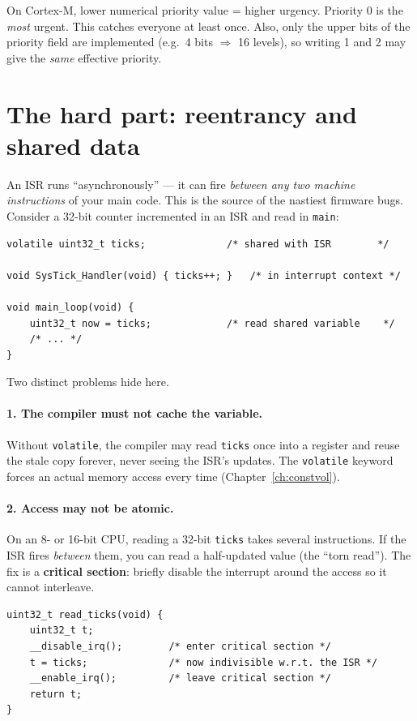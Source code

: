 \documentclass[11pt,a4paper,oneside]{book}
\newcommand{\code}[1]{\texttt{#1}}
\begin{document}
\begin{warning}
On Cortex-M, lower numerical priority value = higher urgency. Priority 0 is the
\emph{most} urgent. This catches everyone at least once. Also, only the upper
bits of the priority field are implemented (e.g.\ 4 bits $\Rightarrow$ 16
levels), so writing 1 and 2 may give the \emph{same} effective priority.
\end{warning}

\section{The hard part: reentrancy and shared data}

An ISR runs ``asynchronously'' --- it can fire \emph{between any two machine
instructions} of your main code. This is the source of the nastiest firmware
bugs. Consider a 32-bit counter incremented in an ISR and read in \code{main}:

\begin{lstlisting}
volatile uint32_t ticks;              /* shared with ISR        */

void SysTick_Handler(void) { ticks++; }   /* in interrupt context */

void main_loop(void) {
    uint32_t now = ticks;             /* read shared variable    */
    /* ... */
}
\end{lstlisting}

Two distinct problems hide here.

\paragraph{1. The compiler must not cache the variable.}
Without \code{volatile}, the compiler may read \code{ticks} once into a
register and reuse the stale copy forever, never seeing the ISR's updates. The
\code{volatile} keyword forces an actual memory access every time
(Chapter~\ref{ch:constvol}).

\paragraph{2. Access may not be atomic.}
On an 8- or 16-bit CPU, reading a 32-bit \code{ticks} takes several
instructions. If the ISR fires \emph{between} them, you can read a half-updated
value (the ``torn read''). The fix is a \textbf{critical section}: briefly
disable the interrupt around the access so it cannot interleave.

\begin{lstlisting}
uint32_t read_ticks(void) {
    uint32_t t;
    __disable_irq();        /* enter critical section */
    t = ticks;              /* now indivisible w.r.t. the ISR */
    __enable_irq();         /* leave critical section */
    return t;
}
\end{lstlisting}
\end{document}
